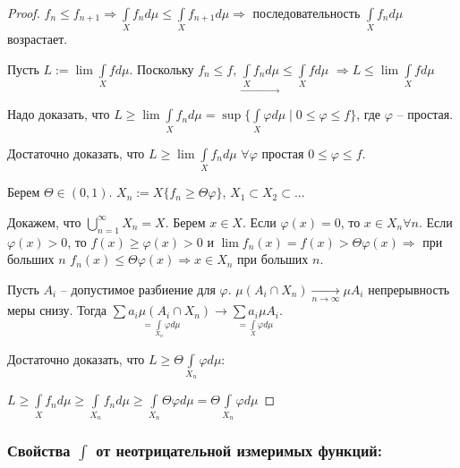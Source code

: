 \begin{proof}
    $f_n \leq f_{n+1}\Rightarrow \int\limits_X f_n d\mu \leq \int\limits_X f_{n+1} d\mu\Rightarrow$
    последовательность $\int\limits_X f_n d\mu$ возрастает.

    Пусть $L:=\lim \int\limits_X f d\mu$. Поскольку $f_n\leq f$, $\underset{\rightarrow}{\int\limits_X f_n d\mu} \leq \int\limits_X f d\mu$
    $\Rightarrow L\leq \lim  \int\limits_X f d\mu$

    Надо доказать, что $L\geq \lim\int\limits_X f_n d\mu=\sup\{\int\limits_X\varphi
    d\mu \mid 0\leq \varphi \leq f\}$, где $\varphi$ – простая. 

    Достаточно доказать, что $L\geq \lim\int\limits_X f_n d\mu$ $\forall \varphi$ простая 
    $0\leq \varphi \leq f$.

    Берем $\Theta\in (0, 1)$. $X_n:=X\{f_n\geq \Theta \varphi\}$, $X_1\subset X_2\subset ...$

    Докажем, что $\bigcup\limits_{n=1}^\infty X_n = X$. Берем $x\in X$. 
    Если $\varphi(x)=0$, то $x\in X_n\forall n$.
    Если $\varphi(x)>0$, то $f(x)\geq \varphi(x)>0$ и $\lim f_n(x)=f(x)>\Theta \varphi(x)
    \Rightarrow$ при больших $n$ $f_n(x)\leq \Theta \varphi(x)\Rightarrow x\in X_n$ при больших $n$.

    Пусть $A_i$ – допустимое разбиение для $\varphi$. $\mu (A_i\cap X_n)\underset{n\rightarrow \infty}{\rightarrow}
    \mu A_i$ непрерывность меры снизу. Тогда $\underset{=\int\limits_{X_n}\varphi d\mu}{\sum a_i \mu(A_i\cap X_n)} \rightarrow  
    \underset{=\int\limits_X\varphi d\mu}{\sum a_i \mu A_i}$.

    Достаточно доказать, что $L\geq \Theta \int\limits_{X_n}\varphi d\mu$: 

    $L\geq \int\limits_Xf_n d\mu\geq \int\limits_{X_n} f_n d\mu\geq \int\limits_{X_n} \Theta \varphi d\mu=
    \Theta \int\limits_{X_n} \varphi d\mu$
\end{proof}

\subsubsection*{Свойства $\int$ от неотрицательной измеримых функций:}

